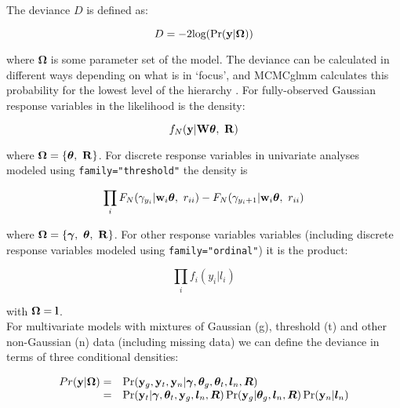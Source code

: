 \documentclass{article}
\begin{document}
The deviance $D$ is defined as:

\begin{equation}
D = -2\textrm{log}(\Pr({\bf y} | {\bm \Omega}))
\end{equation}

where ${\bm \Omega}$ is some parameter set of the model.  The deviance can be calculated in different ways depending on what is in `focus', and MCMCglmm calculates this probability for the lowest level of the hierarchy \citep{Spiegelhalter.2002}. For fully-observed Gaussian response variables in the likelihood is the density:

\begin{equation}
f_{N}({\bf y} | {\bf W}{\bm \theta},\ {\bf R}) 
\end{equation}

where ${\bm \Omega} = \left\{{\bm \theta},\ {\bf R}\right\}$.  For discrete response variables in univariate analyses modeled using \texttt{family="threshold"} the density is

\begin{equation}
\prod_{i} F_{N}(\gamma_{y_{i}} | {\bf w}_{i}{\bm \theta}, \ r_{ii})-F_{N}(\gamma_{y_{i}+1} | {\bf w}_{i}{\bm \theta}, \ r_{ii})
\end{equation}

where ${\bm \Omega} = \left\{{\bm \gamma},\ {\bm \theta},\ {\bf R}\right\}$. For other response variables variables (including discrete response variables modeled using \texttt{family="ordinal"}) it is the product:

\begin{equation}
\prod_{i}f_{i}(y_{i} | l_{i})
\label{LLikL}
\end{equation}

with ${\bm \Omega} = {\bf l}$.\\

For multivariate models with mixtures of Gaussian (g), threshold (t) and other non-Gaussian (n) data (including missing data) we can define the deviance in terms of three conditional densities:  

\begin{equation}
\begin{array}{rl}
Pr({\bf y} | {\bm \Omega}) =& \Pr({\bf y}_{g}, {\bf y}_{t}, {\bf y}_{n} | {\bm \gamma}, {\bm \theta}_{g}, {\bm \theta}_{t}, {\bm l}_{n}, {\bm R})\\
                           =& \Pr({\bf y}_{t} | {\bm \gamma}, {\bm \theta}_{t}, {\bf y}_{g}, {\bm l}_{n}, {\bm R})\Pr({\bf y}_{g} | {\bm \theta}_{g}, {\bm l}_{n}, {\bm R})\Pr({\bf y}_{n} | {\bm l}_{n})\\
\label{Eq-MVdeviance}
\end{array}
\end{equation}
\end{document}
